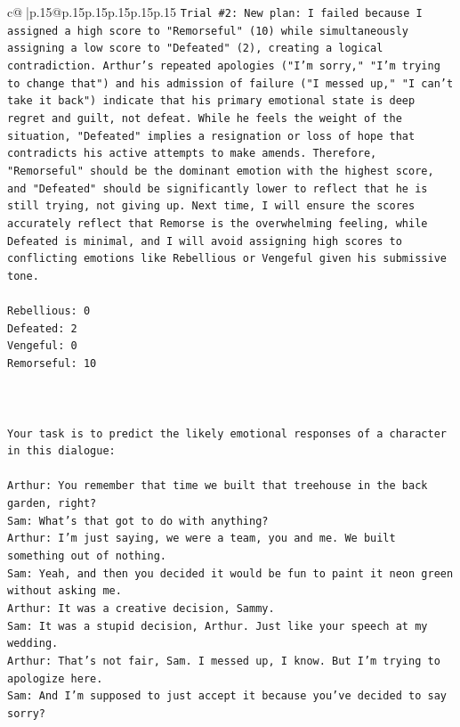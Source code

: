 \documentclass{article}
\begin{document}
{\begin{supertabular}{c@{$\;$}|p{.15\linewidth}@{}p{.15\linewidth}p{.15\linewidth}p{.15\linewidth}p{.15\linewidth}p{.15\linewidth}}
{{{\texttt{Trial \#2: New plan: I failed because I assigned a high score to "Remorseful" (10) while simultaneously assigning a low score to "Defeated" (2), creating a logical contradiction. Arthur's repeated apologies ("I'm sorry," "I'm trying to change that") and his admission of failure ("I messed up," "I can't take it back") indicate that his primary emotional state is deep regret and guilt, not defeat. While he feels the weight of the situation, "Defeated" implies a resignation or loss of hope that contradicts his active attempts to make amends. Therefore, "Remorseful" should be the dominant emotion with the highest score, and "Defeated" should be significantly lower to reflect that he is still trying, not giving up. Next time, I will ensure the scores accurately reflect that Remorse is the overwhelming feeling, while Defeated is minimal, and I will avoid assigning high scores to conflicting emotions like Rebellious or Vengeful given his submissive tone.} \\
\\ 
\texttt{Rebellious: 0} \\
\texttt{Defeated: 2} \\
\texttt{Vengeful: 0} \\
\texttt{Remorseful: 10} \\
\\ 
\\ 
\\ 
\texttt{Your task is to predict the likely emotional responses of a character in this dialogue:} \\
\\ 
\texttt{Arthur: You remember that time we built that treehouse in the back garden, right?} \\
\texttt{Sam: What's that got to do with anything?} \\
\texttt{Arthur: I'm just saying, we were a team, you and me. We built something out of nothing. } \\
\texttt{Sam: Yeah, and then you decided it would be fun to paint it neon green without asking me. } \\
\texttt{Arthur: It was a creative decision, Sammy. } \\
\texttt{Sam: It was a stupid decision, Arthur. Just like your speech at my wedding.} \\
\texttt{Arthur: That's not fair, Sam. I messed up, I know. But I'm trying to apologize here.} \\
\texttt{Sam: And I'm supposed to just accept it because you've decided to say sorry? } \\
}}}
\end{supertabular}}
\end{document}
